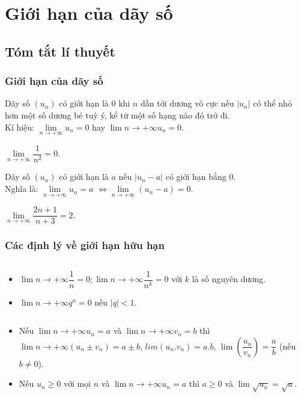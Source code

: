 \section{Giới hạn của dãy số}
\subsection{Tóm tắt lí thuyết}
\subsubsection{Giới hạn của dãy số}
\begin{dn}
	Dãy số $(u_n)$ có giới hạn là $0$ khi $n$ dần tới dương vô cực nếu $|u_n|$ có thể nhỏ hơn một số dương bé tuỳ ý, kể từ một số hạng nào đó trở đi.\\
	Kí hiệu: $\lim\limits_{n \to +\infty}u_n=0$ hay $\lim \limits{n \to +\infty}u_n=0$.
\end{dn}

\begin{vd}
	$\lim\limits_{n \to +\infty}\dfrac{1}{n^2}=0$.
\end{vd}

\begin{dn}
	Dãy số $(u_n)$ có giới hạn là $a$ nếu $|u_n-a|$ có giới hạn bằng $0$.\\
	Nghĩa là: $\lim\limits_{n \to +\infty}u_n=a$  $\Leftrightarrow \lim\limits_{n \to +\infty}(u_n-a)=0$.
\end{dn}

\begin{vd}
	$\lim\limits_{n\to +\infty}{\dfrac{2n+1}{n+3}}=2$.
\end{vd}
\subsubsection{Các định lý về giới hạn hữu hạn}
\begin{dl}$\textrm{ }$\\
	\begin{itemize}
\item  $\lim \limits{n \to +\infty}\dfrac{1}{n}=0; \lim \limits{n \to +\infty}\dfrac{1}{n^k}=0$ với $k$ là số nguyên dương.\\
\item  $\lim \limits{n \to +\infty}q^n=0$ nếu $|q|<1$.
\end{itemize}
\end{dl}

\begin{dl}$\textrm{ }$\\
	\begin{itemize}
		\item  Nếu $\lim \limits{n \to +\infty}u_n=a$ và $\lim \limits{n \to +\infty}v_n=b$  thì $\lim \limits{n \to +\infty}\left(u_n\pm v_n\right)=a\pm b$, $lim \left(u_n.v_n\right)=a.b$, $\lim\left(\dfrac{u_n}{v_n}\right)=\dfrac{a}{b}$ (nếu $b\neq 0$).
		\item  Nếu $u_n\geq 0$ với mọi $n$ và $\lim \limits{n \to +\infty}u_n=a$ thì $a\geq 0$ và $\lim\sqrt{u_n}=\sqrt{a}$.
	\end{itemize}
\end{dl}

